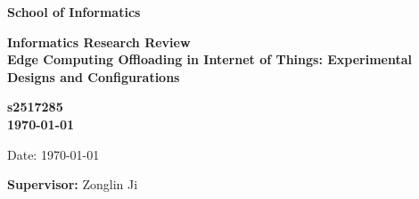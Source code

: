 \documentclass[a4paper,11pt]{article}
\newcommand{\examnumber}{s2517285}
\newcommand{\field}{Edge Computing Offloading in Internet of Things: Experimental Designs and Configurations}
\newcommand{\supervisor}{Zonglin Ji}
\begin{document}
\begin{minipage}[b]{110mm}
        {\Huge\bf School of Informatics
        \vspace*{17mm}}
\end{minipage}
\hfill
\begin{minipage}[t]{40mm}               
\end{minipage}
\par\noindent
\vspace*{2cm}
\begin{center}
        \Large\bf Informatics Research Review \\
        \Large\bf \field
\end{center}
\vspace*{1.5cm}
\begin{center}
        \bf \examnumber\\
        \monthyeardate\today
\end{center}
\vspace*{5mm}
        
%
%                       
\begin{abstract}
        \noindent Based on the increasingly popular trend of edge computing, amounts of papers have concentrated on the optimization algorithms on the edge. However, due to the various configurations of the model, it is impossible to effectively compare between different algorithms. Hence, this review will focus on the difference between these configurations and the reasons for the design.
\end{abstract}

\vspace*{1cm}

\vspace*{3cm}
Date: \today

\vfill
{\bf Supervisor:} \supervisor
\newpage

\setcounter{page}{1}                            %
\footruleheight{1pt}
\headruleheight{1pt}
\rhead{- \thepage}
\cfoot{}
%
\end{document}
